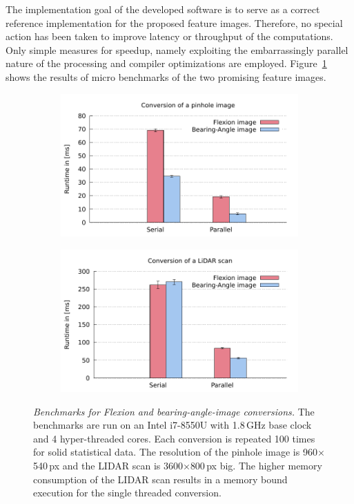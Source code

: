 The implementation goal of the developed software is to serve as a correct reference implementation for the proposed feature images.
Therefore, no special action has been taken to improve latency or throughput of the computations.
Only simple measures for speedup, namely exploiting the embarrassingly parallel nature of the processing and compiler optimizations are employed.
Figure~\ref{fig:benchmarks} shows the results of micro benchmarks of the two promising feature images.
\begin{figure}
\centering
    \begin{subfigure}[b]{0.49\linewidth}
        \includegraphics[width=\linewidth]{chapter06/results/benchmarks/pinhole_benchmarks.pdf}
    \end{subfigure}
    \begin{subfigure}[b]{0.49\linewidth}
        \includegraphics[width=\linewidth]{chapter06/results/benchmarks/laserscan_benchmarks.pdf}
    \end{subfigure}
    \caption[Benchmarks for Flexion and \gls{bearing-angle-image} conversions]{\emph{Benchmarks for Flexion and \gls{bearing-angle-image} conversions.} The benchmarks are run on an Intel i7-8550U with 1.8\,GHz base clock and 4 hyper-threaded cores. Each conversion is repeated 100 times for solid statistical data. The resolution of the pinhole image is 960$\times$540\,px and the \acrshort{LIDAR} scan is 3600$\times$800\,px big. The higher memory consumption of the \acrshort{LIDAR} scan results in a memory bound execution for the single threaded conversion.}\label{fig:benchmarks}
\end{figure}
